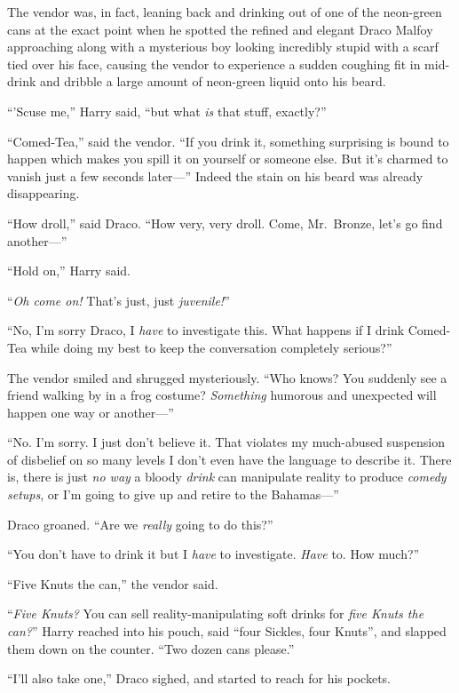 The vendor was, in fact, leaning back and drinking out of one of the neon-green cans at the exact point when he spotted the refined and elegant Draco Malfoy approaching along with a mysterious boy looking incredibly stupid with a scarf tied over his face, causing the vendor to experience a sudden coughing fit in mid-drink and dribble a large amount of neon-green liquid onto his beard.

“’Scuse me,” Harry said, “but what \emph{is} that stuff, exactly?”

“Comed-Tea,” said the vendor. “If you drink it, something surprising is bound to happen which makes you spill it on yourself or someone else. But it’s charmed to vanish just a few seconds later—” Indeed the stain on his beard was already disappearing.

“How droll,” said Draco. “How very, very droll. Come, Mr.~Bronze, let’s go find another—”

“Hold on,” Harry said.

“\emph{Oh come on!} That’s just, just \emph{juvenile!}”

“No, I’m sorry Draco, I \emph{have} to investigate this. What happens if I drink Comed-Tea while doing my best to keep the conversation completely serious?”

The vendor smiled and shrugged mysteriously. “Who knows? You suddenly see a friend walking by in a frog costume? \emph{Something} humorous and unexpected will happen one way or another—”

“No. I’m sorry. I just don’t believe it. That violates my much-abused suspension of disbelief on so many levels I don’t even have the language to describe it. There is, there is just \emph{no way} a bloody \emph{drink} can manipulate reality to produce \emph{comedy setups}, or I’m going to give up and retire to the Bahamas—”

Draco groaned. “Are we \emph{really} going to do this?”

“You don’t have to drink it but I \emph{have} to investigate. \emph{Have} to. How much?”

“Five Knuts the can,” the vendor said.

“\emph{Five Knuts?} You can sell reality-manipulating soft drinks for \emph{five Knuts the can?}” Harry reached into his pouch, said “four Sickles, four Knuts”, and slapped them down on the counter. “Two dozen cans please.”

“I’ll also take one,” Draco sighed, and started to reach for his pockets.

